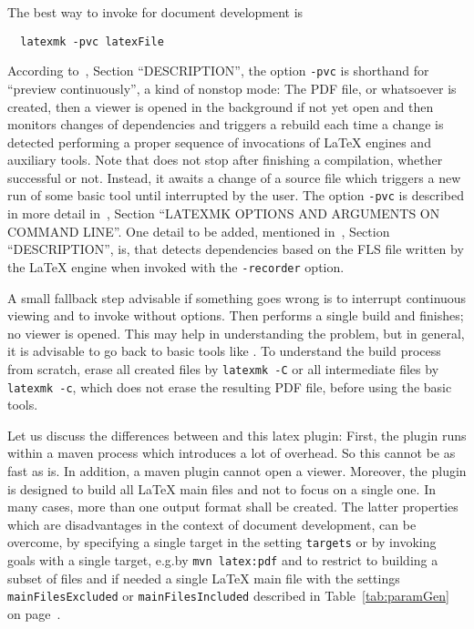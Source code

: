 The best way to invoke  for document development is 
%
\begin{Verbatim}
  latexmk -pvc latexFile
\end{Verbatim}

According to~\cite{LatexMk23}, Section ``DESCRIPTION'', 
the option \texttt{-pvc} is shorthand for ``preview continuously'', 
a kind of nonstop mode: 
The PDF file, or whatsoever is created, 
then a viewer is opened in the background 
if not yet open 
and then  monitors changes of dependencies 
and triggers a rebuild each time a change is detected 
performing a proper sequence of invocations of \LaTeX{} engines and auxiliary tools. 
Note that  does not stop after finishing a compilation, 
whether successful or not. 
Instead, it awaits a change of a source file which triggers a new run of some basic tool 
until interrupted by the user. 
The option \texttt{-pvc} is described in more detail 
in~\cite{LatexMk23}, Section ``LATEXMK OPTIONS AND ARGUMENTS ON COMMAND LINE''. 
One detail to be added, mentioned in~\cite{LatexMk23}, Section ``DESCRIPTION'', is, 
that  detects dependencies 
based on the FLS file written by the \LaTeX{} engine 
when invoked with the \texttt{-recorder} option. 

A small fallback step advisable if something goes wrong 
is to interrupt continuous viewing and to invoke  without options. 
Then  performs a single build and finishes; no viewer is opened. 
This may help in understanding the problem, 
but in general, it is advisable to go back to basic tools like \lualatex. 
To understand the build process from scratch, 
erase all created files by \texttt{latexmk -C} 
or all intermediate files by \texttt{latexmk -c}, which does not erase the resulting PDF file, 
before using the basic tools. 
\medskip



Let us discuss the differences between  and this latex plugin: 
First, the plugin runs within a maven process which introduces a lot of overhead. 
So this cannot be as fast as  is. 
In addition, a maven plugin cannot open a viewer. 
Moreover, the plugin is designed to build all \LaTeX{} main files %
and not to focus on a single one. 
In many cases, more than one output format shall be created. 
The latter properties which are disadvantages in the context of document development, 
can be overcome, by specifying a single target in the setting \texttt{targets} 
or by invoking goals with a single target, e.g.\@ by \texttt{mvn latex:pdf} 
and to restrict to building a subset of files and if needed a single \LaTeX{} main file
with the settings \texttt{mainFilesExcluded} or \texttt{mainFilesIncluded} 
described in Table~\ref{tab:paramGen} on page~\pageref{tab:paramGen}. 

